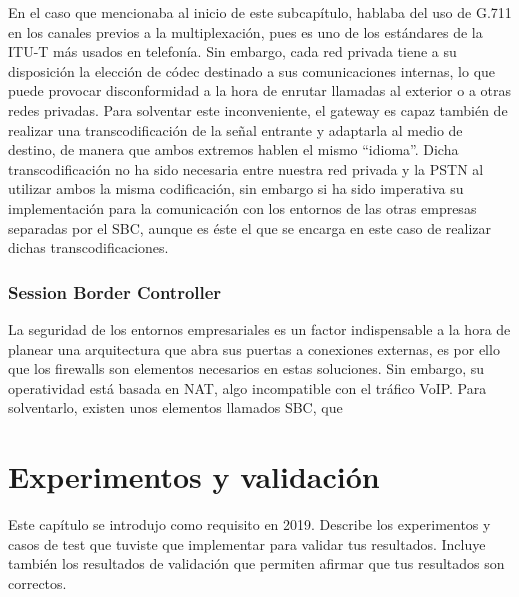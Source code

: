 \documentclass[a4paper, 12pt]{book}
\begin{document}
En el caso que mencionaba al inicio de este subcapítulo, hablaba del uso de G.711 en los canales previos a la multiplexación, pues es uno de los estándares de la ITU-T más usados en telefonía. Sin embargo, cada red privada tiene a su disposición la elección de códec destinado a sus comunicaciones internas, lo que puede provocar disconformidad a la hora de enrutar llamadas al exterior o a otras redes privadas. 
Para solventar este inconveniente, el gateway es capaz también de realizar una transcodificación de la señal entrante y adaptarla al medio de destino, de manera que ambos extremos hablen el mismo ``idioma''. Dicha transcodificación no ha sido necesaria entre nuestra red privada y la PSTN al utilizar ambos la misma codificación, sin embargo si ha sido imperativa su implementación para la comunicación con los entornos de las otras empresas separadas por el SBC, aunque es éste el que se encarga en este caso de realizar dichas transcodificaciones.

\subsection{Session Border Controller}
\label{sec:sbc}

La seguridad de los entornos empresariales es un factor indispensable a la hora de planear una arquitectura que abra sus puertas a conexiones externas, es por ello que los firewalls son elementos necesarios en estas soluciones. Sin embargo, su operatividad está basada en NAT, algo incompatible con el tráfico VoIP.
Para solventarlo, existen unos elementos llamados SBC, que


\cleardoublepage
\chapter{Experimentos y validación}

Este capítulo se introdujo como requisito en 2019.
Describe los experimentos y casos de test que tuviste que implementar para validar tus resultados.
Incluye también los resultados de validación que permiten afirmar que tus resultados son correctos.


\end{document}
